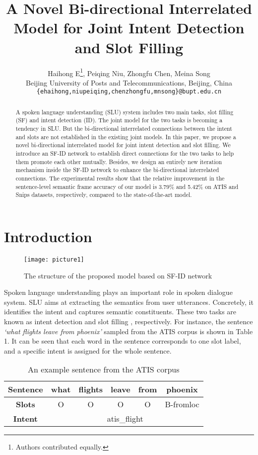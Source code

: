 \documentclass[11pt,a4paper]{article}
\title{A Novel Bi-directional Interrelated Model for Joint Intent Detection and Slot Filling}
\author{
Haihong E\thanks{\indent Authors contributed
equally.},
Peiqing Niu\footnotemark[1],
Zhongfu Chen\footnotemark[1],
Meina Song\\
Beijing University of Posts and Telecommunications, Beijing, China\\
\texttt{\{ehaihong,niupeiqing,chenzhongfu,mnsong\}@bupt.edu.cn}\\
}
\begin{document}
\maketitle
\begin{abstract}
A spoken language understanding (SLU) system includes two main tasks, slot filling (SF) and intent detection (ID). The joint model for the two tasks is becoming a tendency in SLU. But the bi-directional interrelated connections between the intent and slots are not established in the existing joint models. In this paper, we propose a novel bi-directional interrelated model for joint intent detection and slot filling. We introduce an SF-ID network to establish direct connections for the two tasks to help them promote each other mutually. Besides, we design an entirely new iteration mechanism inside the SF-ID network to enhance the bi-directional interrelated connections. The experimental results show that the relative improvement in the sentence-level semantic frame accuracy of our model is 3.79\% and 5.42\% on ATIS and Snips datasets, respectively, compared to the state-of-the-art model.
\end{abstract}

\section{Introduction}
\begin{figure*}
	\centering
	\texttt{[image: picture1]}
	\caption{\label{fig:hist}The structure of the proposed model based on SF-ID network}
\end{figure*}
Spoken language understanding plays an important role in spoken dialogue system. SLU aims at extracting the semantics from user utterances. Concretely, it identifies the intent and captures semantic constituents. These two tasks are known as intent detection and slot filling \cite{tur2011spoken}, respectively. For instance, the sentence \textsl{`what flights leave from phoenix'} sampled from the ATIS corpus is shown in Table 1. It can be seen that each word in the sentence corresponds to one slot label, and a specific intent is assigned for the whole sentence.
\begin{table}[ht]
	\centering
	\small
	\begin{tabular}{|c|c|c|c|c|c|}
		\hline
		\textbf{Sentence}&what&flights&leave&from&phoenix\\
		\hline
		\textbf{Slots}&O&O&O&O&B-fromloc\\
		\hline
		\textbf{Intent}&\multicolumn{5}{|c|}{atis\_flight}\\
		\hline
	\end{tabular}
	\caption{\label{font-table}An example sentence from the ATIS corpus}
\end{table}
\end{document}

